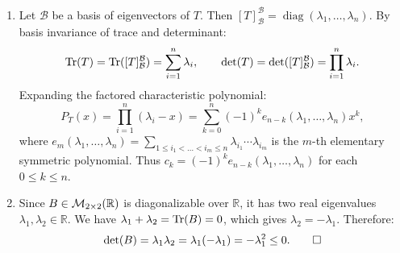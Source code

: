 \begin{exercisesolution}
\label{sol:trace_determinant_char_poly_diagonalizable}
\begin{enumerate}[label=\textbf{(\alph*)}]
    \item Let $\mathcal{B}$ be a basis of eigenvectors of $T$. Then $[T]_\mathcal{B}^\mathcal{B} = \operatorname{diag}(\lambda_1, \dots, \lambda_n)$.
    By basis invariance of trace and determinant:
    \[
    \operatorname{Tr}(T) = \operatorname{Tr}([T]_\mathcal{B}^\mathcal{B}) = \sum_{i=1}^n \lambda_i, \qquad \det(T) = \det([T]_\mathcal{B}^\mathcal{B}) = \prod_{i=1}^n \lambda_i.
    \]
    Expanding the factored characteristic polynomial:
    \[
    P_T(x) = \prod_{i=1}^n (\lambda_i - x) = \sum_{k=0}^n (-1)^k e_{n-k}(\lambda_1, \dots, \lambda_n) x^k,
    \]
    where $e_m(\lambda_1, \dots, \lambda_n) = \sum_{1 \le i_1 < \dots < i_m \le n} \lambda_{i_1} \cdots \lambda_{i_m}$ is the $m$-th elementary symmetric polynomial.
    Thus $c_k = (-1)^k e_{n-k}(\lambda_1, \dots, \lambda_n)$ for each $0 \le k \le n$.

    \item Since $B \in \mathcal{M}_{2 \times 2}(\mathbb{R})$ is diagonalizable over $\mathbb{R}$, it has two real eigenvalues $\lambda_1, \lambda_2 \in \mathbb{R}$.
    We have $\lambda_1 + \lambda_2 = \operatorname{Tr}(B) = 0$, which gives $\lambda_2 = -\lambda_1$.
    Therefore:
    \[
    \det(B) = \lambda_1 \lambda_2 = \lambda_1(-\lambda_1) = -\lambda_1^2 \le 0. \qedhere
    \]
\end{enumerate}
\end{exercisesolution}

